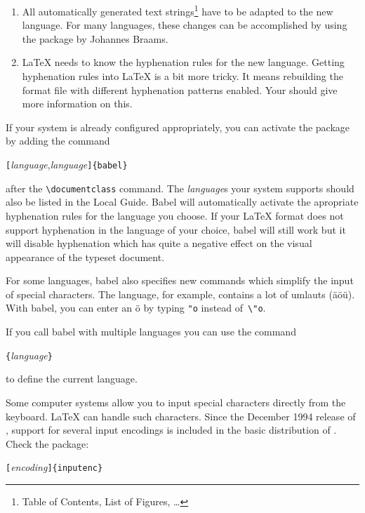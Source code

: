 \begin{enumerate}
\item All automatically generated text strings\footnote{Table of
    Contents, List of Figures, \ldots} have to be adapted to the new
  language.  For many languages, these changes can be accomplished by
  using the  package by Johannes Braams.
\item \LaTeX{} needs to know the hyphenation rules for the new
  language. Getting hyphenation rules into \LaTeX{} is a bit more
  tricky. It means rebuilding the format file with different
  hyphenation patterns enabled. Your \guide{} should give more
  information on this.
\end{enumerate}

If your system is already configured appropriately, you can activate
the  package by adding the command
\begin{lscommand}
\verb|[|\emph{language},\emph{language}\verb|]{babel}| 
\end{lscommand}
\noindent after the \verb|\documentclass| command. The \emph{language}s your
system supports should also be listed in the Local Guide. Babel will
automatically activate the apropriate hyphenation rules for the
language you choose. If your \LaTeX{} format does not support
hyphenation in the language of your choice, babel will still work but
it will disable hyphenation which has quite a negative effect on the
visual appearance of the typeset document.

For some languages, \textsf{babel} also specifies new commands which
simplify the input of special characters. The  language, for
example, contains a lot of umlauts (\"a\"o\"u).  With \textsf{babel},
you can enter an \"o by typing \verb|"o| instead of~\verb|\"o|.

If you call babel with multiple languages you can use the command 
\begin{lscommand}
\verb|{|\emph{language}\verb|}|
\end{lscommand}
to define the current language.

Some computer systems allow you to input special characters directly
from the keyboard. \LaTeX{} can handle such characters. Since the
December 1994 release of \LaTeXe{}, support for several input
encodings is included in the basic distribution of \LaTeXe. Check the
 package:
\begin{lscommand}
\verb|[|\emph{encoding}\verb|]{inputenc}| 
\end{lscommand}


